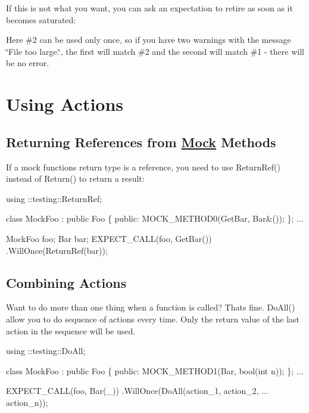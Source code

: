 If this is not what you want, you can ask an expectation to retire as soon as it becomes saturated\+:




Here \#2 can be used only once, so if you have two warnings with the message {\ttfamily \char`\"{}\+File too large.\char`\"{}}, the first will match \#2 and the second will match \#1 -\/ there will be no error.

\section*{Using Actions}

\subsection*{Returning References from \hyperlink{class_mock}{Mock} Methods}

If a mock function\textquotesingle{}s return type is a reference, you need to use {\ttfamily Return\+Ref()} instead of {\ttfamily Return()} to return a result\+:


\begin{DoxyCode}
using ::testing::ReturnRef;

class MockFoo : public Foo \{
 public:
  MOCK\_METHOD0(GetBar, Bar&());
\};
...

  MockFoo foo;
  Bar bar;
  EXPECT\_CALL(foo, GetBar())
      .WillOnce(ReturnRef(bar));
\end{DoxyCode}


\subsection*{Combining Actions}

Want to do more than one thing when a function is called? That\textquotesingle{}s fine. {\ttfamily Do\+All()} allow you to do sequence of actions every time. Only the return value of the last action in the sequence will be used.


\begin{DoxyCode}
using ::testing::DoAll;

class MockFoo : public Foo \{
 public:
  MOCK\_METHOD1(Bar, bool(int n));
\};
...

  EXPECT\_CALL(foo, Bar(\_))
      .WillOnce(DoAll(action\_1,
                      action\_2,
                      ...
                      action\_n));
\end{DoxyCode}


